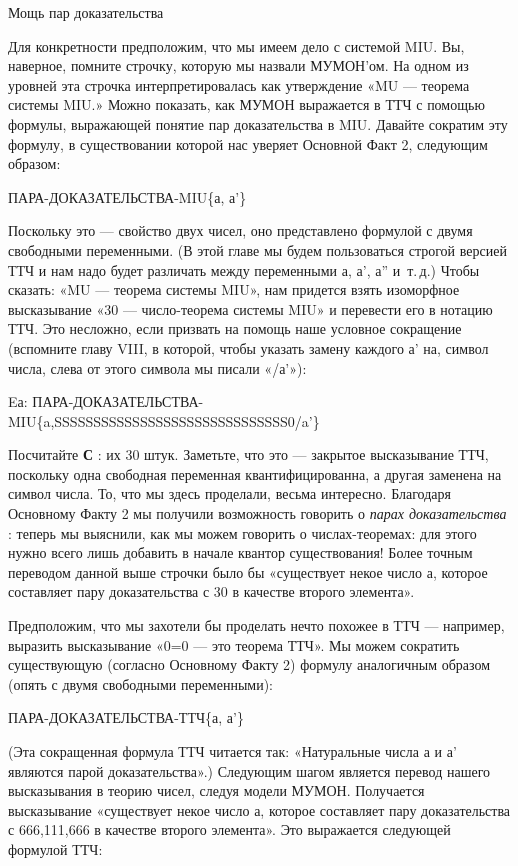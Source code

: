 \documentclass[../main.tex]{subfiles}
\begin{document}
Мощь пар доказательства

Для конкретности предположим, что мы имеем дело с системой MIU\@. Вы, наверное, помните строчку, которую мы назвали МУМОН'ом. На одном из уровней эта строчка интерпретировалась как утверждение «MU --- теорема системы MIU.» Можно показать, как МУМОН выражается в ТТЧ с помощью формулы, выражающей понятие пар доказательства в MIU\@. Давайте сократим эту формулу, в существовании которой нас уверяет Основной Факт 2, следующим образом:

ПАРА-ДОКАЗАТЕЛЬСТВА-MIU\{а, а'\}

Поскольку это --- свойство двух чисел, оно представлено формулой с двумя свободными переменными. (В этой главе мы будем пользоваться строгой версией ТТЧ и нам надо будет различать между переменными а, а', а'' и~т.\,д.) Чтобы сказать: «MU --- теорема системы MIU», нам придется взять изоморфное высказывание «30 --- число-теорема системы MIU» и перевести его в нотацию ТТЧ\@. Это несложно, если призвать на помощь наше условное сокращение (вспомните главу VIII, в которой, чтобы указать замену каждого а' на, символ числа, слева от этого символа мы писали «/а'»):

Eа: ПАРА-ДОКАЗАТЕЛЬСТВА-MIU\{a,SSSSSSSSSSSSSSSSSSSSSSSSSSSSSS0/a'\}

Посчитайте \textbf{С} : их 30 штук. Заметьте, что это --- закрытое высказывание ТТЧ, поскольку одна свободная переменная квантифицированна, а другая заменена на символ числа. То, что мы здесь проделали, весьма интересно. Благодаря Основному Факту 2 мы получили возможность говорить о \emph{парах доказательства} : теперь мы выяснили, как мы можем говорить о числах-теоремах: для этого нужно всего лишь добавить в начале квантор существования! Более точным переводом данной выше строчки было бы «существует некое число а, которое составляет пару доказательства с 30 в качестве второго элемента».

Предположим, что мы захотели бы проделать нечто похожее в ТТЧ --- например, выразить высказывание «0=0 --- это теорема ТТЧ». Мы можем сократить существующую (согласно Основному Факту 2) формулу аналогичным образом (опять с двумя свободными переменными):

ПАРА-ДОКАЗАТЕЛЬСТВА-ТТЧ\{а, а'\}

(Эта сокращенная формула ТТЧ читается так: «Натуральные числа а и а' являются парой доказательства».) Следующим шагом является перевод нашего высказывания в теорию чисел, следуя модели МУМОН. Получается высказывание «существует некое число а, которое составляет пару доказательства с 666,111,666 в качестве второго элемента». Это выражается следующей формулой ТТЧ:
\end{document}
